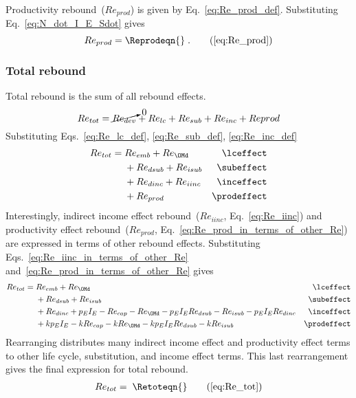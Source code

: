 \subsubsection{\Prodeffect{}} 
\label{sec:Re_prod}

Productivity rebound~($Re_{prod}$) is given by Eq.~\ref{eq:Re_prod_def}.
Substituting Eq.~\ref{eq:N_dot_I_E_Sdot} gives
%
\begin{equation}
  Re_{prod} = \Reprodeqn{} \; . \tag{\ref{eq:Re_prod}}
\end{equation}


\subsubsection{Total rebound} 
\label{sec:total_rebound}

Total rebound is the sum of all rebound effects.
%
\begin{equation}
  Re_{tot} = \cancelto{0}{Re_{dev}} + Re_{lc} + Re_{sub} + Re_{inc} + Re{prod}
\end{equation}
%
Substituting Eqs.~\ref{eq:Re_lc_def}, \ref{eq:Re_sub_def}, \ref{eq:Re_inc_def}
%
\begin{align}
  Re_{tot} = \; &Re_{emb} + Re_{\OMd}      & \mathrm{\lceffect}   \nonumber \\
                &+ Re_{dsub} + Re_{isub}   & \mathrm{\subeffect}  \nonumber \\
                &+ Re_{dinc} + Re_{iinc}   & \mathrm{\inceffect}  \nonumber \\
                &+ Re_{prod}               & \mathrm{\prodeffect}
\end{align}
%
Interestingly, 
indirect income effect rebound~($Re_{iinc}$, Eq.~\ref{eq:Re_iinc}) and
productivity effect rebound~($Re_{prod}$, Eq.~\ref{eq:Re_prod_in_terms_of_other_Re})
are expressed in terms of other rebound effects.
Substituting Eqs.~\ref{eq:Re_iinc_in_terms_of_other_Re} and~\ref{eq:Re_prod_in_terms_of_other_Re} gives
%
\begin{align}
  Re_{tot} = \; &Re_{emb} + Re_{\OMd}      & \mathrm{\lceffect}                             \nonumber \\
                &+ Re_{dsub} + Re_{isub}   & \mathrm{\subeffect}                            \nonumber \\
                &+ Re_{dinc} + p_E I_E - Re_{cap} - Re_{\OMd} - p_E I_E Re_{dsub} 
                             - Re_{isub} - p_E I_E Re_{dinc}   & \mathrm{\inceffect}        \nonumber \\
                &+ k p_E I_E - k Re_{cap} - k Re_{\OMd} - k p_E I_E Re_{dsub} - k Re_{isub}  & \mathrm{\prodeffect}
\end{align}
%
Rearranging distributes many indirect income effect and productivity effect terms 
to other life cycle, substitution, and income effect terms.
This last rearrangement gives the final expression for total rebound.
%
\begin{align}
  Re_{tot} = \; \Retoteqn{} \tag{\ref{eq:Re_tot}}
\end{align}

